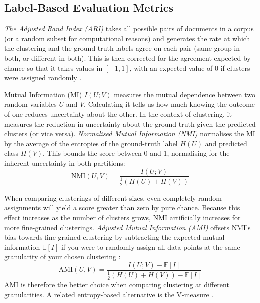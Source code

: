 \documentclass[11pt,a4paper,oneside]{report}
\begin{document}
\subsection{Label-Based Evaluation Metrics}\label{sec:labelbased}

\emph{The Adjusted Rand Index (ARI)} takes all possible pairs of documents in a corpus (or a random subset for computational reasons) and generates the rate at which the clustering and the ground-truth labels agree on each pair (same group in both, or different in both). This is then corrected for the agreement expected by chance so that it takes values in $[-1, 1]$, with an expected value of 0 if clusters were assigned randomly \citep{hubert1985comparing}.

Mutual Information (MI) $I(U;V)$ measures the mutual dependence between two random variables $U$ and $V$. Calculating it tells us how much knowing the outcome of one reduces uncertainty about the other. In the context of clustering, it measures the reduction in uncertainty about the ground truth given the predicted clusters (or vice versa). \emph{Normalised Mutual Information (NMI)} normalises the MI by the average of the entropies of the ground-truth label $H(U)$ and predicted class $H(V)$. This bounds the score between 0 and 1, normalising for the inherent uncertainty in both partitions:
\begin{equation}
\mathrm{NMI}(U,V) = \frac{I(U;V)}{\tfrac{1}{2}\left(H(U)+H(V)\right)}
\end{equation}

When comparing clusterings of different sizes, even completely random assignments will yield a score greater than zero by pure chance. Because this effect increases as the number of clusters grows, NMI artificially increases for more fine-grained clusterings. \emph{Adjusted Mutual Information (AMI)} offsets NMI's bias towards fine grained clustering by subtracting the expected mutual information $\mathbb{E}[I]$ if you were to randomly assign all data points at the same granularity of your chosen clustering \citep{vinh2010information}:
\begin{equation}
\mathrm{AMI}(U,V) = \frac{I(U;V) - \mathbb{E}[I]}{\tfrac{1}{2}\left(H(U)+H(V)\right) - \mathbb{E}[I]}
\end{equation}
AMI is therefore the better choice when comparing clustering at different granularities. A related entropy-based alternative is the V-measure \citep{rosenberg2007vmeasure}.
\end{document}
